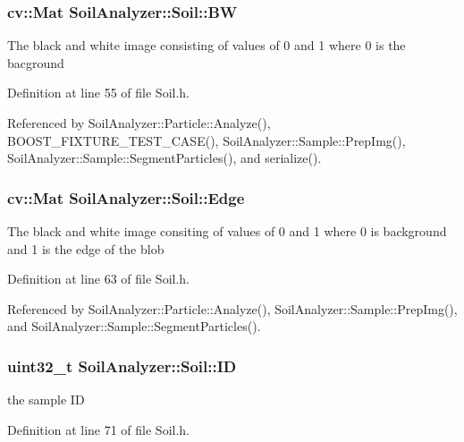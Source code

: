 \subsubsection[{B\+W}]{\setlength{\rightskip}{0pt plus 5cm}cv\+::\+Mat Soil\+Analyzer\+::\+Soil\+::\+B\+W}\label{class_soil_analyzer_1_1_soil_ae11b578192ebae3165f75c09d6116f74}
The black and white image consisting of values of 0 and 1 where 0 is the bacground 

Definition at line 55 of file Soil.\+h.



Referenced by Soil\+Analyzer\+::\+Particle\+::\+Analyze(), B\+O\+O\+S\+T\+\_\+\+F\+I\+X\+T\+U\+R\+E\+\_\+\+T\+E\+S\+T\+\_\+\+C\+A\+S\+E(), Soil\+Analyzer\+::\+Sample\+::\+Prep\+Img(), Soil\+Analyzer\+::\+Sample\+::\+Segment\+Particles(), and serialize().

\hypertarget{class_soil_analyzer_1_1_soil_ab867a74ecebcd5a3d84e2f9ea806b874}{}
\subsubsection[{Edge}]{\setlength{\rightskip}{0pt plus 5cm}cv\+::\+Mat Soil\+Analyzer\+::\+Soil\+::\+Edge}\label{class_soil_analyzer_1_1_soil_ab867a74ecebcd5a3d84e2f9ea806b874}
The black and white image consiting of values of 0 and 1 where 0 is background and 1 is the edge of the blob 

Definition at line 63 of file Soil.\+h.



Referenced by Soil\+Analyzer\+::\+Particle\+::\+Analyze(), Soil\+Analyzer\+::\+Sample\+::\+Prep\+Img(), and Soil\+Analyzer\+::\+Sample\+::\+Segment\+Particles().

\hypertarget{class_soil_analyzer_1_1_soil_a0011c3cd2a504e34c5962cbf72e397da}{}
\subsubsection[{I\+D}]{\setlength{\rightskip}{0pt plus 5cm}uint32\+\_\+t Soil\+Analyzer\+::\+Soil\+::\+I\+D}\label{class_soil_analyzer_1_1_soil_a0011c3cd2a504e34c5962cbf72e397da}
the sample I\+D 

Definition at line 71 of file Soil.\+h.




